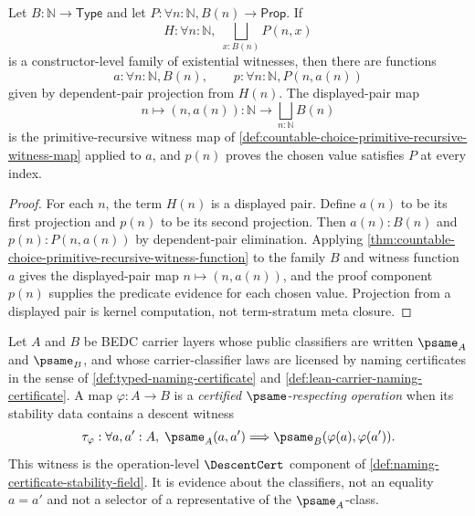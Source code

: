 \begin{corollary}
\label{cor:witnessed-countable-choice-for-predicates}
Let $B:\mathbb{N}\to\mathsf{Type}$ and let $P:\forall n:\mathbb{N},B(n)\to\mathsf{Prop}$. If
$$
H:\forall n:\mathbb{N},\;\bigsqcup_{x:B(n)}P(n,x)
$$
is a constructor-level family of existential witnesses, then there are functions
$$
a:\forall n:\mathbb{N},B(n),\qquad p:\forall n:\mathbb{N},P(n,a(n))
$$
given by dependent-pair projection from $H(n)$. The displayed-pair map
$$
n\mapsto (n,a(n)):\mathbb{N}\to\bigsqcup_{n:\mathbb{N}}B(n)
$$
is the primitive-recursive witness map of \autoref{def:countable-choice-primitive-recursive-witness-map} applied to $a$, and $p(n)$ proves the chosen value satisfies $P$ at every index.
\end{corollary}

\begin{proof}
For each $n$, the term $H(n)$ is a displayed pair. Define $a(n)$ to be its first projection and $p(n)$ to be its second projection. Then $a(n):B(n)$ and $p(n):P(n,a(n))$ by dependent-pair elimination. Applying \autoref{thm:countable-choice-primitive-recursive-witness-function} to the family $B$ and witness function $a$ gives the displayed-pair map $n\mapsto(n,a(n))$, and the proof component $p(n)$ supplies the predicate evidence for each chosen value. Projection from a displayed pair is kernel computation, not term-stratum meta closure.
\end{proof}

\begin{definition}
\label{def:namecert-psame-respecting-operation}
Let $A$ and $B$ be BEDC carrier layers whose public classifiers are written $\psame_A$ and $\psame_B$, and whose carrier-classifier laws are licensed by naming certificates in the sense of \autoref{def:typed-naming-certificate} and \autoref{def:lean-carrier-naming-certificate}. A map $\varphi:A\to B$ is a \emph{certified $\psame$-respecting operation} when its stability data contains a descent witness
$$
\tau_\varphi:\forall a,a':A,\; \psame_A(a,a')\Longrightarrow \psame_B(\varphi(a),\varphi(a')).
$$
This witness is the operation-level $\DescentCert$ component of \autoref{def:naming-certificate-stability-field}. It is evidence about the classifiers, not an equality $a=a'$ and not a selector of a representative of the $\psame_A$-class.
\end{definition}

